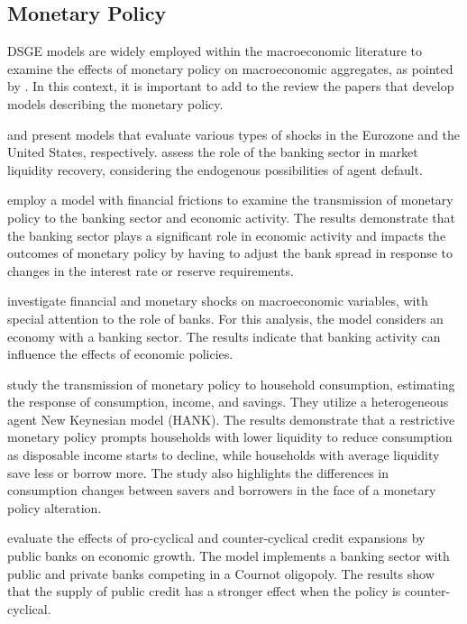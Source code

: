 \documentclass[../thesis.tex]{subfiles}
\begin{document}
	\subsection*{Monetary Policy}
	
	DSGE models are widely employed within the macroeconomic literature to examine the effects of monetary policy on macroeconomic aggregates, as pointed by \textcite{gali_monetary_2015}. In this context, it is important to add to the review the papers that develop models describing the monetary policy.
	
	\textcite{smets_estimated_2003} and \textcite{smets_shocks_2007} present models that evaluate various types of shocks in the Eurozone and the United States, respectively. \textcite{walque_financial_2010} assess the role of the banking sector in market liquidity recovery, considering the endogenous possibilities of agent default.
	
	\textcite{vinhado_politica_2016} employ a model with financial frictions to examine the transmission of monetary policy to the banking sector and economic activity. The results demonstrate that the banking sector plays a significant role in economic activity and impacts the outcomes of monetary policy by having to adjust the bank spread in response to changes in the interest rate or reserve requirements.

	\textcite{soltani_investigating_2021} investigate financial and monetary shocks on macroeconomic variables, with special attention to the role of banks. For this analysis, the model considers an economy with a banking sector. The results indicate that banking activity can influence the effects of economic policies.

	\textcite{holm_transmission_2021} study the transmission of monetary policy to household consumption, estimating the response of consumption, income, and savings. They utilize a heterogeneous agent New Keynesian model (HANK). The results demonstrate that a restrictive monetary policy prompts households with lower liquidity to reduce consumption as disposable income starts to decline, while households with average liquidity save less or borrow more. The study also highlights the differences in consumption changes between savers and borrowers in the face of a monetary policy alteration.
	
	\textcite{capeleti_countercyclical_2022} evaluate the effects of pro-cyclical and counter-cyclical credit expansions by public banks on economic growth. The model implements a banking sector with public and private banks competing in a Cournot oligopoly. The results show that the supply of public credit has a stronger effect when the policy is counter-cyclical.
		
\end{document}
